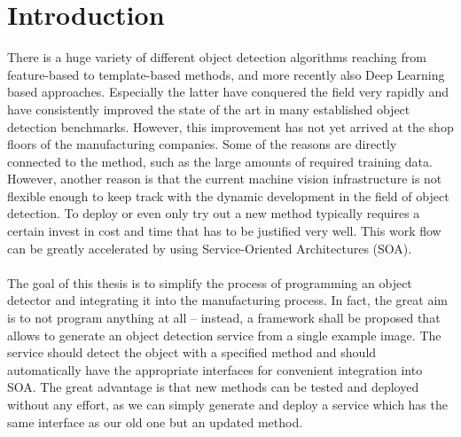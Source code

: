 \chapter{Introduction\label{cha:chapter1}}
There is a huge variety of different object detection algorithms reaching from feature-based to template-based methods, and more recently also Deep Learning based approaches. Especially the latter have conquered the field very rapidly and have consistently improved the state of the art in many established object detection benchmarks. However, this improvement has not yet arrived at the shop floors of the manufacturing companies. Some of the reasons are directly connected to the method, such as the large amounts of required training data. However, another reason is that the current machine vision infrastructure is not flexible enough to keep track with the dynamic development in the field of object detection. To deploy or even only try out a new method typically requires a certain invest in cost and time that has to be justified very well. This work flow can be greatly accelerated by using Service-Oriented Architectures (SOA).
\\
\\
The goal of this thesis is to simplify the process of programming an object detector and integrating it into the manufacturing process. In fact, the great aim is to not program anything at all – instead, a framework shall be proposed that allows to generate an object detection service from a single example image.
The service should detect the object with a specified method and should automatically have the appropriate interfaces for convenient integration into SOA. The great advantage is that new methods can be tested and deployed without any effort, as we can simply generate and deploy a service which has the same interface as our old one but an updated method.
 